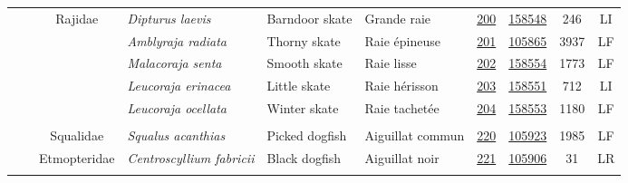 \documentclass[12pt]{article}\usepackage[]{graphicx}\usepackage[]{color}
\begin{document}
\begin{landscapepage}
\begin{longtable}[t]{ccc>{\centering\arraybackslash}p{3cm}>{\centering\arraybackslash}p{3cm}>{\centering\arraybackslash}p{3cm}>{}c>{}ccc}
\hspace{1em}\hspace{1em} &  & Rajidae & \em{Dipturus laevis} & Barndoor skate & Grande raie & \href{#sec:200}{200} & \href{http://www.marinespecies.org/aphia.php?p=taxdetails&id=158548}{158548} & 246 & LI\\
\nopagebreak
\hspace{1em}\hspace{1em} &  &  & \em{Amblyraja radiata} & Thorny skate & Raie épineuse & \href{#sec:201}{201} & \href{http://www.marinespecies.org/aphia.php?p=taxdetails&id=105865}{105865} & 3937 & LF\\
\nopagebreak
\hspace{1em}\hspace{1em} &  &  & \em{Malacoraja senta} & Smooth skate & Raie lisse & \href{#sec:202}{202} & \href{http://www.marinespecies.org/aphia.php?p=taxdetails&id=158554}{158554} & 1773 & LF\\
\nopagebreak
\hspace{1em}\hspace{1em} &  &  & \em{Leucoraja erinacea} & Little skate & Raie hérisson & \href{#sec:203}{203} & \href{http://www.marinespecies.org/aphia.php?p=taxdetails&id=158551}{158551} & 712 & LI\\
\nopagebreak
\hspace{1em}\hspace{1em} &  &  & \em{Leucoraja ocellata} & Winter skate & Raie tachetée & \href{#sec:204}{204} & \href{http://www.marinespecies.org/aphia.php?p=taxdetails&id=158553}{158553} & 1180 & LF\\
\nopagebreak
\addlinespace[0.3em]
\\
\hspace{1em}\hspace{1em} &  & Squalidae & \em{Squalus acanthias} & Picked dogfish & Aiguillat commun & \href{#sec:220}{220} & \href{http://www.marinespecies.org/aphia.php?p=taxdetails&id=105923}{105923} & 1985 & LF\\
\nopagebreak
\hspace{1em}\hspace{1em} &  & Etmopteridae & \em{Centroscyllium fabricii} & Black dogfish & Aiguillat noir & \href{#sec:221}{221} & \href{http://www.marinespecies.org/aphia.php?p=taxdetails&id=105906}{105906} & 31 & LR\\
\pagebreak[0]
\addlinespace[0.3em]

\end{longtable}
\end{landscapepage}
\end{document}
